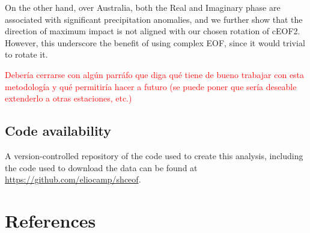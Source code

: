 \documentclass[smallextended]{svjour3}       %
\begin{document}
On the other hand, over Australia, both the Real and Imaginary phase are associated with significant precipitation anomalies, and we further show that the direction of maximum impact is not aligned with our chosen rotation of cEOF2.
However, this underscore the benefit of using complex EOF, since it would trivial to rotate it.

\textcolor{red}{Debería cerrarse con algún parráfo que diga qué tiene de bueno trabajar con esta metodología y qué permitiría hacer a futuro (se puede poner que sería deseable extenderlo a otras estaciones, etc.)}

\hypertarget{code-availability}{%
\subsection*{Code availability}\label{code-availability}}

A version-controlled repository of the code used to create this analysis, including the code used to download the data can be found at \url{https://github.com/eliocamp/shceof}.

\hypertarget{references}{%
\section{References}\label{references}}




\end{document}
